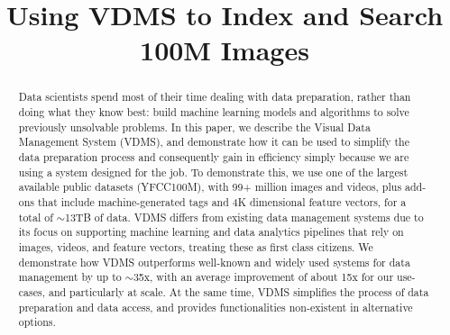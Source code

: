 \usepackage{filecontents}



\date{}

\title{\Large \bf Using VDMS to Index and Search 100M Images}


\maketitle

\begin{abstract}
Data scientists spend most of their time dealing with data preparation,
rather than doing what they know best:
build machine learning models and algorithms to solve previously unsolvable problems.
In this paper, we describe the Visual Data Management System (VDMS),
and demonstrate how it can be used to simplify the data preparation process 
and consequently gain in efficiency simply because 
we are using a system designed for the job.
To demonstrate this, we use one of the largest available
public datasets (YFCC100M),
with 99+ million images and videos, plus add-ons that include
machine-generated tags and 4K dimensional feature vectors,
for a total of $\sim$13TB of data.
VDMS differs from existing data management systems
due to its focus on supporting machine learning and
data analytics pipelines that rely on images, videos, and feature vectors, 
treating these as first class citizens.
We demonstrate how VDMS outperforms well-known and widely used
systems for data management by up to $\sim$35x, with
an average improvement of about 15x for our use-cases, and particularly at scale.
At the same time, VDMS simplifies the process of data preparation and data access,
and provides functionalities non-existent in alternative options.
\end{abstract}

